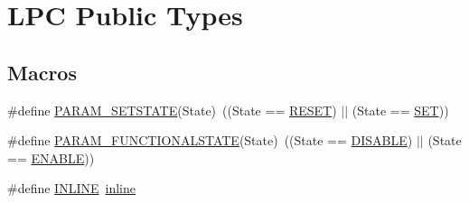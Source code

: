 \hypertarget{group__LPC__Types__Public__Types}{\section{L\-P\-C Public Types}
\label{group__LPC__Types__Public__Types}
}
\subsection*{Macros}
\begin{DoxyCompactItemize}
\item 
\#define \hyperlink{group__LPC__Types__Public__Types_gafb6827323e4c501477936a84bd733b4f}{P\-A\-R\-A\-M\-\_\-\-S\-E\-T\-S\-T\-A\-T\-E}(State)~((State == \hyperlink{group__LPC__Types__Public__Types_gga89136caac2e14c55151f527ac02daaffa589b7d94a3d91d145720e2fed0eb3a05}{R\-E\-S\-E\-T}) $\vert$$\vert$ (State == \hyperlink{group__LPC__Types__Public__Types_gga89136caac2e14c55151f527ac02daaffab44c8101cc294c074709ec1b14211792}{S\-E\-T}))
\item 
\#define \hyperlink{group__LPC__Types__Public__Types_ga5475435ea985fe5abbf2048e87e3e682}{P\-A\-R\-A\-M\-\_\-\-F\-U\-N\-C\-T\-I\-O\-N\-A\-L\-S\-T\-A\-T\-E}(State)~((State == \hyperlink{group__LPC__Types__Public__Types_ggac9a7e9a35d2513ec15c3b537aaa4fba1ad3a9df141be0ccf10389b640f492b26d}{D\-I\-S\-A\-B\-L\-E}) $\vert$$\vert$ (State == \hyperlink{group__LPC__Types__Public__Types_ggac9a7e9a35d2513ec15c3b537aaa4fba1a7d46875fa3ebd2c34d2756950eda83bf}{E\-N\-A\-B\-L\-E}))
\item 
\#define \hyperlink{group__LPC__Types__Public__Types_ga2eb6f9e0395b47b8d5e3eeae4fe0c116}{I\-N\-L\-I\-N\-E}~\hyperlink{RVDS_2ARM7__LPC21xx_2portmacro_8h_a00d24c7231be28dbaf71f5408f30e44c}{inline}
\end{DoxyCompactItemize}
